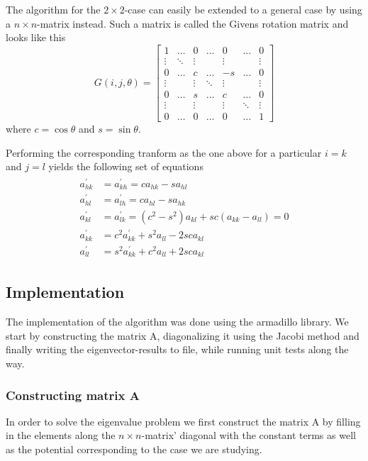 \documentclass[10pt, a4paper]{amsart}
\begin{document}
The algorithm for the $2\times2$-case can easily be extended to a general case by using a $n\times n$-matrix instead. Such a matrix is called the Givens rotation matrix and looks like this
\begin{equation}
G(i,j,\theta) = \begin{bmatrix}
1 & \hdots & 0 &\hdots & 0 & \hdots & 0 \\
    \vdots & \ddots & \vdots & {} & \vdots & {} & \vdots \\
    0 & \hdots & c &\hdots & -s & \hdots & 0 \\
    \vdots & {} & \vdots & \ddots & \vdots & {} & \vdots \\
    0 & \hdots & s &\hdots & c & \hdots & 0 \\
    \vdots & {} & \vdots & {} & \vdots & \ddots & \vdots \\
0 & \hdots & 0 &\hdots & 0 & \hdots & 1
\end{bmatrix}
\end{equation}
where $c= \cos{\theta}$ and $s=\sin{\theta}$.

Performing the corresponding tranform as the one above for a particular $i=k$ and $j=l$ yields the following set of equations
\begin{align}
\label{eq:rotation}
\begin{split}
  a^{\prime}_{hk} &= a^{\prime}_{kh} = ca_{hk} - sa_{hl} \\
  a^{\prime}_{hl} &= a^{\prime}_{lh} = ca_{hl} - sa_{hk} \\
  a^{\prime}_{kl} &= a^{\prime}_{lk} = (c^2 - s^2)a_{kl} + sc(a_{kk} - a_{ll}) = 0\\
  a^{\prime}_{kk} &= c^2a^{\prime}_{kk} + s^2a_{ll} - 2sca_{kl}\\
  a^{\prime}_{ll} &= s^2a^{\prime}_{kk} + c^2a_{ll} + 2sca_{kl}
\end{split}
\end{align}

\subsection{Implementation}
The implementation of the algorithm was done using the armadillo library. We start by constructing the matrix A, diagonalizing it using the Jacobi method and finally writing the eigenvector-results to file, while running unit tests along the way.

\subsubsection{Constructing matrix A} In order to solve the eigenvalue problem we first construct the matrix A by filling in the elements along the $n\times n$-matrix' diagonal with the constant terms as well as the potential corresponding to the case we are studying.
\end{document}
